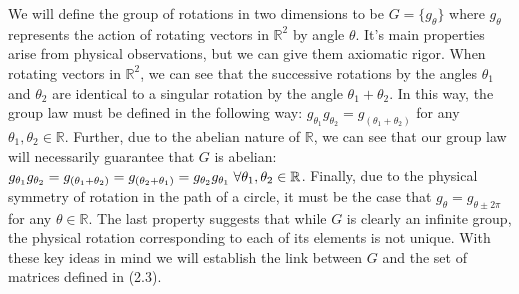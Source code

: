 \documentclass[10pt]{ucthesis}
\newcommand{\R}{\mathbb{R}}
\begin{document}
We will define the group of rotations in two dimensions to be $G = \{g_\theta\}$ where $g_\theta$ represents the action of rotating vectors in $\R^2$ by angle $\theta$. It's main properties arise from physical observations, but we can give them axiomatic rigor. When rotating vectors in $\R^2$, we can see that the successive rotations by the angles $\theta_1$ and $\theta_2$ are identical to a singular rotation by the angle $\theta_1+\theta_2$. In this way, the group law must be defined in the following way: $g_{\theta_1}  g_{\theta_2} = g_{(\theta_1 + \theta_2)}$ for any $\theta_1,\theta_2\in\R$. Further, due to the abelian nature of $\R$, we can see that our group law will necessarily guarantee that $G$ is abelian:  $g_{\theta_1}  g_{\theta_2} = g_{(\theta_1 + \theta_2)}= g_{(\theta_2 + \theta_1)}= g_{\theta_2}  g_{\theta_1} \hspace{1mm}\forall \theta_1,\theta_2\in\R$. Finally, due to the physical symmetry of rotation in the path of a circle, it must be the case that $g_\theta = g_{\theta \pm 2\pi}$ for any $\theta \in \R$. The last property suggests that while $G$ is clearly an infinite group, the physical rotation corresponding to each of its elements is not unique. With these key ideas in mind we will establish the link between $G$ and the set of matrices defined in (2.3).
\end{document}
